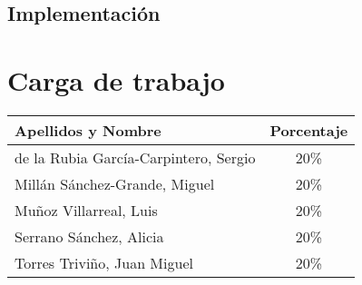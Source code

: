 \documentclass[11pt,a4paper,spanish,twoside]{book}
\begin{document}
\section{Implementación}

\appendix
\chapter{Carga de trabajo}
\begin{center}
  \begin{tabular}{p{10cm}|c}
    \textbf{Apellidos y Nombre} & \textbf{Porcentaje} \\ \hline \hline
    de la Rubia García-Carpintero, Sergio & 20\% \\
    Millán Sánchez-Grande, Miguel         & 20\% \\ 
    Muñoz Villarreal, Luis                & 20\% \\ 
    Serrano Sánchez, Alicia               & 20\% \\ 
    Torres Triviño, Juan Miguel           & 20\% \\
  \end{tabular}
\end{center}
\end{document}
